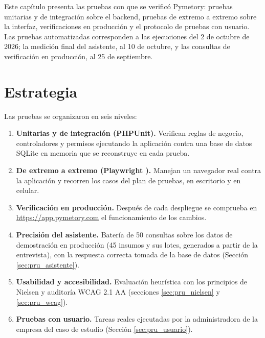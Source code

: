 
Este capítulo presenta las pruebas con que se verificó Pymetory: pruebas unitarias y de integración sobre el backend, pruebas de extremo a extremo sobre la interfaz, verificaciones en producción y el protocolo de pruebas con usuario. Las pruebas automatizadas corresponden a las ejecuciones del 2 de octubre de 2026; la medición final del asistente, al 10 de octubre, y las consultas de verificación en producción, al 25 de septiembre.

\section{Estrategia}
\label{sec:pru_estrategia}

Las pruebas se organizaron en seis niveles:

\begin{enumerate}
    \item \textbf{Unitarias y de integración (PHPUnit).} Verifican reglas de negocio, controladores y permisos ejecutando la aplicación contra una base de datos SQLite en memoria que se reconstruye en cada prueba.
    \item \textbf{De extremo a extremo (Playwright \cite{playwright}).} Manejan un navegador real contra la aplicación y recorren los casos del plan de pruebas, en escritorio y en celular.
    \item \textbf{Verificación en producción.} Después de cada despliegue se comprueba en \url{https://app.pymetory.com} el funcionamiento de los cambios.
    \item \textbf{Precisión del asistente.} Batería de 50 consultas sobre los datos de demostración en producción (45 insumos y sus lotes, generados a partir de la entrevista), con la respuesta correcta tomada de la base de datos (Sección \ref{sec:pru_asistente}).
    \item \textbf{Usabilidad y accesibilidad.} Evaluación heurística con los principios de Nielsen y auditoría WCAG 2.1 AA (secciones \ref{sec:pru_nielsen} y \ref{sec:pru_wcag}).
    \item \textbf{Pruebas con usuario.} Tareas reales ejecutadas por la administradora de la empresa del caso de estudio (Sección \ref{sec:pru_usuario}).
\end{enumerate}

